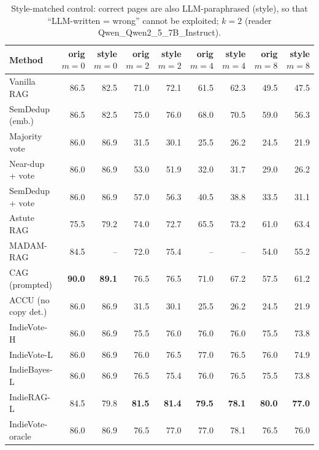 \begin{table}[tbp]
\centering
\small
\caption{Style-matched control: correct pages are also LLM-paraphrased (style), so that ``LLM-written = wrong'' cannot be exploited; $k{=}2$ (reader Qwen\_Qwen2\_5\_7B\_Instruct).}
\label{tab:style}
\setlength{\tabcolsep}{4pt}
\begin{tabular}{lrrrrrrrr}
\toprule
Method & orig $m{=}0$ & style $m{=}0$ & orig $m{=}2$ & style $m{=}2$ & orig $m{=}4$ & style $m{=}4$ & orig $m{=}8$ & style $m{=}8$ \\
\midrule
Vanilla RAG & 86.5 & 82.5 & 71.0 & 72.1 & 61.5 & 62.3 & 49.5 & 47.5 \\
SemDedup (emb.) & 86.5 & 82.5 & 75.0 & 76.0 & 68.0 & 70.5 & 59.0 & 56.3 \\
Majority vote & 86.0 & 86.9 & 31.5 & 30.1 & 25.5 & 26.2 & 24.5 & 21.9 \\
Near-dup + vote & 86.0 & 86.9 & 53.0 & 51.9 & 32.0 & 31.7 & 29.0 & 26.2 \\
SemDedup + vote & 86.0 & 86.9 & 57.0 & 56.3 & 40.5 & 38.8 & 33.5 & 31.1 \\
Astute RAG & 75.5 & 79.2 & 74.0 & 72.7 & 65.5 & 73.2 & 61.0 & 63.4 \\
MADAM-RAG & 84.5 & -- & 72.0 & 75.4 & -- & -- & 54.0 & 55.2 \\
CAG (prompted) & \textbf{90.0} & \textbf{89.1} & 76.5 & 76.5 & 71.0 & 67.2 & 57.5 & 61.2 \\
ACCU (no copy det.) & 86.0 & 86.9 & 31.5 & 30.1 & 25.5 & 26.2 & 24.5 & 21.9 \\
IndieVote-H & 86.0 & 86.9 & 75.5 & 76.0 & 76.0 & 76.0 & 75.5 & 73.8 \\
IndieVote-L & 86.0 & 86.9 & 76.0 & 76.5 & 77.0 & 76.5 & 76.0 & 74.9 \\
IndieBayes-L & 86.0 & 86.9 & 76.5 & 75.4 & 76.0 & 76.5 & 75.5 & 73.8 \\
IndieRAG-L & 84.5 & 79.8 & \textbf{81.5} & \textbf{81.4} & \textbf{79.5} & \textbf{78.1} & \textbf{80.0} & \textbf{77.0} \\
IndieVote-oracle & 86.0 & 86.9 & 76.5 & 77.0 & 77.0 & 78.1 & 76.5 & 76.0 \\
\bottomrule
\end{tabular}
\end{table}
